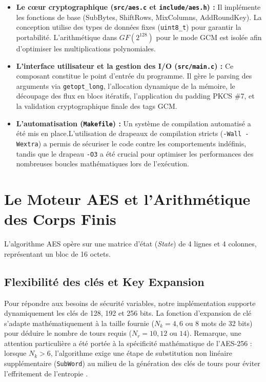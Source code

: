 \documentclass[12pt,a4paper]{article}
\begin{document}
\begin{itemize}
    \item \textbf{Le cœur cryptographique (\texttt{src/aes.c} et \texttt{include/aes.h}) :} 
    Il implémente les fonctions de base (SubBytes, ShiftRows, MixColumns, AddRoundKey). La conception utilise des types de données fixes (\texttt{uint8\_t}) pour garantir la portabilité. L'arithmétique dans $GF(2^{128})$ pour le mode GCM est isolée afin d'optimiser les multiplications polynomiales.
    
    \item \textbf{L’interface utilisateur et la gestion des I/O (\texttt{src/main.c}) :} Ce composant constitue le point d'entrée du programme. Il gère le parsing des arguments via \texttt{getopt\_long}, l'allocation dynamique de la mémoire, le découpage des flux en blocs itératifs, l'application du padding PKCS \#7, et la validation cryptographique finale des tags GCM.\\
    
    \item \textbf{L'automatisation (\texttt{Makefile}) :} Un système de compilation automatisé a été mis en place.L'utilisation de drapeaux de compilation stricts (\texttt{-Wall -Wextra}) a permis de sécuriser le code contre les comportements indéfinis, tandis que le drapeau \texttt{-O3} a été crucial pour optimiser les performances des nombreuses boucles mathématiques lors de l'exécution.\\

\end{itemize}

\section{Le Moteur AES et l'Arithmétique des Corps Finis}

L'algorithme AES opère sur une matrice d'état (\textit{State}) de 4 lignes et 4 colonnes, représentant un bloc de 16 octets.

\subsection{Flexibilité des clés et Key Expansion}
Pour répondre aux besoins de sécurité variables, notre implémentation supporte dynamiquement les clés de 128, 192 et 256 bits. La fonction d'expansion de clé s'adapte mathématiquement à la taille fournie ($N_k = 4, 6 \text{ ou } 8$ mots de 32 bits) pour déduire le nombre de tours requis ($N_r = 10, 12 \text{ ou } 14$). Remarque, une attention particulière a été portée à la spécificité mathématique de l'AES-256 : lorsque $N_k > 6$, l'algorithme exige une étape de substitution non linéaire supplémentaire (\texttt{SubWord}) au milieu de la génération des clés de tours pour éviter l'effritement de l'entropie \cite{fips197}.
\end{document}
